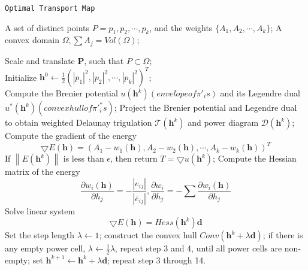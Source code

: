 \begin{algorithm}[H]
    \renewcommand{\algorithmicrequire}{\textbf{Input:}}
	\renewcommand{\algorithmicensure}{\textbf{Output:}}
    \caption{\texttt{Optimal Transport Map}}
    \label{alg:Optimal Transport Map}
    \begin{algorithmic}[1]
        \REQUIRE A set of distinct points $P={p_1, p_2, \cdots , p_k}$, and the weights $\{A_1, A_2, \cdots , A_k \}$; A convex domain $\Omega, \sum A_j = Vol(\Omega)$;

        \STATE Scale and translate $\mathbf{P}$, such that $P \subset \Omega$;\\
        \STATE Initialize $\mathbf{h}^0 \gets \frac{1}{2} \left ( \left | p_1 \right |^2, \left | p_2 \right |^2, \cdots, \left | p_k \right |^2   \right )^T  $;\\  
        \STATE Compute the Brenier potential $u(\mathbf{h}^k)(envelope of \pi'_is)$ and its Legendre dual $u^* (\mathbf{h}^k)(convex hull of \pi'^{*}_is)$;
        \STATE Project the Brenier potential and Legendre dual to obtain weighted Delaunay trigulation $\mathcal{T}(\mathbf{h}^k)$ and power diagram $\mathcal{D}(\mathbf{h}^k)$;
        \STATE Compute the gradient of the energy
            \begin{equation*}
                \bigtriangledown E(\mathbf{h} )=(A_1-w_1(\mathbf{h}), A_2-w_2(\mathbf{h}), \cdots , A_k-w_k(\mathbf{h} ) )^T
            \end{equation*}
        \STATE If $\left \| E(\mathbf{h}^k) \right \| $ is less than $\epsilon$, then return $T=\bigtriangledown u(\mathbf{h}^k)$;
        \STATE Compute the Hessian matrix of the energy
            \begin{equation*}
                \frac{\partial w_i(\mathbf{h})}{\partial h_j}=-\frac{\left | e_{ij} \right | }{\left | \bar{e}_{ij}  \right | } , \frac{\partial  w_i}{\partial  h_j} =-\sum \frac{\partial  w_i(\mathbf{h})}{\partial h_j}  
            \end{equation*}
        \STATE Solve linear system 
            \begin{equation*}
                \bigtriangledown E(\mathbf{h})=Hess(\mathbf{h}^k)\mathbf{d}
            \end{equation*}
        \STATE Set the step length $\lambda \gets 1$;
        \STATE construct the convex hull $Conv(\mathbf{h}^k + \lambda \mathbf{d})$;
        \STATE if there is any empty power cell, $\lambda \gets \frac{1}{2} \lambda $, repeat step 3 and 4, until all power cells are non-empty;
        \STATE set $\mathbf{h}^{k+1} \gets \mathbf{h}^{k} + \lambda \mathbf{d}$;
        \STATE repeat step 3 through 14.
    \end{algorithmic}
\end{algorithm}

